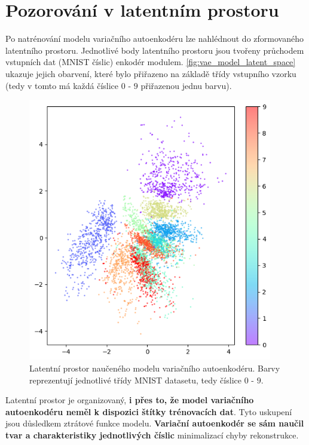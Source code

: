 \section{Pozorování v latentním prostoru}
\label{sec:vae_model_latent_space_observation}

Po natrénování modelu variačního autoenkodéru lze nahlédnout do zformovaného latentního prostoru.
Jednotlivé body latentního prostoru jsou tvořeny průchodem vstupních dat (MNIST číslic) enkodér modulem.
\autoref{fig:vae_model_latent_space} ukazuje jejich obarvení, které bylo přiřazeno na základě třídy vstupního vzorku (tedy v tomto má každá číslice $0$ - $9$ přiřazenou jednu barvu).


\begin{figure}[H]
    \centering
    \includegraphics[width=0.95\textwidth]{figures/latent_space_200_epochs.png}
    \caption{Latentní prostor naučeného modelu variačního autoenkodéru. Barvy reprezentují jednotlivé třídy MNIST datasetu, tedy číslice $0$ - $9$. }
    \label{fig:vae_model_latent_space}
\end{figure}

Latentní prostor je organizovaný, \textbf{i přes to, že model variačního autoenkodéru neměl k dispozici štítky trénovacích dat}. 
Tyto uskupení jsou důsledkem ztrátové funkce modelu.
\textbf{Variační autoenkodér se sám naučil tvar a charakteristiky jednotlivých číslic} minimalizací chyby rekonstrukce.

